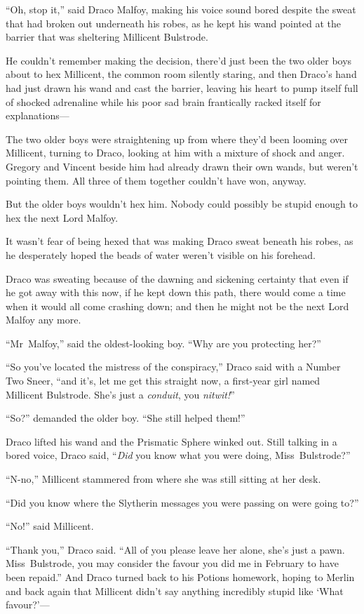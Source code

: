 “Oh, stop it,” said Draco Malfoy, making his voice sound bored despite the
sweat that had broken out underneath his robes, as he kept his wand pointed at
the barrier that was sheltering Millicent Bulstrode.

He couldn’t remember making the decision, there’d just been the two older boys
about to hex Millicent, the common room silently staring, and then Draco’s hand
had just drawn his wand and cast the barrier, leaving his heart to pump itself
full of shocked adrenaline while his poor sad brain frantically racked itself
for explanations—

The two older boys were straightening up from where they’d been looming over
Millicent, turning to Draco, looking at him with a mixture of shock and anger.
Gregory and Vincent beside him had already drawn their own wands, but weren’t
pointing them. All three of them together couldn’t have won, anyway.

But the older boys wouldn’t hex him. Nobody could possibly be stupid enough to
hex the next Lord Malfoy.

It wasn’t fear of being hexed that was making Draco sweat beneath his robes, as
he desperately hoped the beads of water weren’t visible on his forehead.

Draco was sweating because of the dawning and sickening certainty that even if
he got away with this now, if he kept down this path, there would come a time
when it would all come crashing down; and then he might not be the next Lord
Malfoy any more.

“Mr~Malfoy,” said the oldest-looking boy. “Why are you protecting her?”

“So you’ve located the mistress of the conspiracy,” Draco said with a Number
Two Sneer, “and it’s, let me get this straight now, a first-year girl named
Millicent Bulstrode. She’s just a \emph{conduit}, you \emph{nitwit!}”

“So?” demanded the older boy. “She still helped them!”

Draco lifted his wand and the Prismatic Sphere winked out. Still talking in a
bored voice, Draco said, “\emph{Did} you know what you were doing,
Miss~Bulstrode?”

“N-no,” Millicent stammered from where she was still sitting at her desk.

“Did you know where the Slytherin messages you were passing on were going to?”

“No!” said Millicent.

“Thank you,” Draco said. “All of you please leave her alone, she’s just a pawn.
Miss~Bulstrode, you may consider the favour you did me in February to have been
repaid.” And Draco turned back to his Potions homework, hoping to Merlin and
back again that Millicent didn’t say anything incredibly stupid like ‘What
favour?’—

